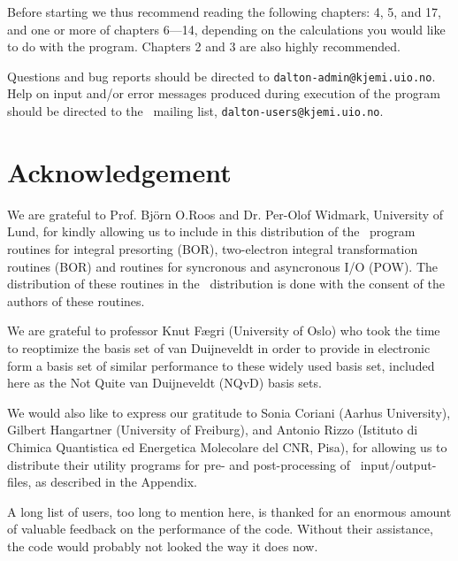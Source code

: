 Before starting we thus recommend reading
the following chapters: 4, 5, and 17, and one or more of chapters
6---14, depending on the
calculations you would like to do with the program. Chapters
2 and 3 are also highly recommended.

Questions and bug reports should be directed to
\verb|dalton-admin@kjemi.uio.no|. Help on input and/or error messages
produced during execution of the program should be directed to the
\siraba\ mailing list, \verb|dalton-users@kjemi.uio.no|.

\section{Acknowledgement}

We are grateful to Prof. Bj\"{o}rn O.Roos and Dr. Per-Olof
Widmark, University of Lund, for kindly allowing us to include in
this distribution of the \siraba\ program routines for integral
presorting (BOR), two-electron integral
transformation routines (BOR) and
routines for syncronous and asyncronous I/O (POW). The
distribution of these routines in the \siraba\ distribution is
done with the consent of the authors of these routines.

We are grateful to professor Knut F\ae gri (University of Oslo) who
took the time to reoptimize the basis set of van Duijneveldt in order
to provide in electronic form a basis set of similar performance to
these widely used basis set, included here as the Not Quite van
Duijneveldt (NQvD) basis sets.

We would also like to express our gratitude to Sonia Coriani (Aarhus
University), Gilbert Hangartner (University of Freiburg), and Antonio
Rizzo (Istituto di Chimica Quantistica ed Energetica Molecolare del
CNR, Pisa), for allowing us to distribute their utility programs for
pre- and post-processing of \siraba\ input/output-files, as described
in the Appendix.

A long list of users, too long to mention here, is thanked for an
enormous amount of valuable feedback on the performance of the
code. Without their assistance, the code would probably not looked the
way it does now.
